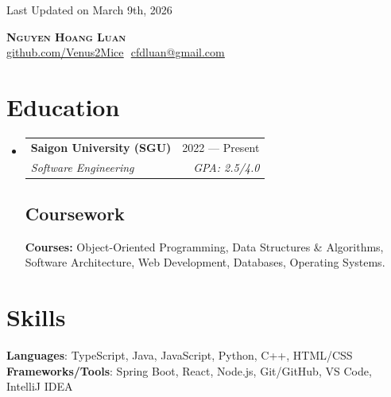 \documentclass[letterpaper,11pt]{article}
\makeatletter
\newcommand{\resumeSubheading}[4]{
  \vspace{-2pt}\item
    \begin{tabular*}{0.97\textwidth}[t]{l@{\extracolsep{\fill}}r}
      \textbf{#1} & #2 \\
      \textit{\small#3} & \textit{\small #4} \\
    \end{tabular*}\vspace{-7pt}
}
\newcommand{\resumeSubHeadingListStart}{\begin{itemize}[leftmargin=0.15in, label={}]}
\newcommand{\resumeSubHeadingListEnd}{\end{itemize}}
\makeatother
\begin{document}
\begin{flushright}
  \color{gray}
  \item
  Last Updated on March 9th, 2026
\end{flushright}

\vspace{-5pt}

\begin{center}
    \textbf{\Huge \scshape Nguyen Hoang Luan} \\ \vspace{8pt}
    \small 
    \href{https://github.com/Venus2Mice}{\underline{github.com/Venus2Mice}} $  $
    \href{mailto:cfdluan@gmail.com}
    {\underline{cfdluan@gmail.com}}
\end{center}

\section{Education}
  \resumeSubHeadingListStart
  
    \resumeSubheading
      {Saigon University (SGU)}{2022 — Present}
      {Software Engineering}{GPA: 2.5/4.0}

    \vspace{-10pt}

    \subsection{Coursework}
      \textbf{Courses:} Object-Oriented Programming, Data Structures \& Algorithms, Software Architecture, Web Development, Databases, Operating Systems.

  \resumeSubHeadingListEnd

\section{Skills}
 \begin{itemize}[leftmargin=0.15in, label={}]
    \small{\item{
    
     \textbf{Languages}{: TypeScript, Java, JavaScript, Python, C++, HTML/CSS} \\
     
     \textbf{Frameworks/Tools}{: Spring Boot, React, Node.js, Git/GitHub, VS Code, IntelliJ IDEA}
     
    }}
 \end{itemize}
\end{document}
